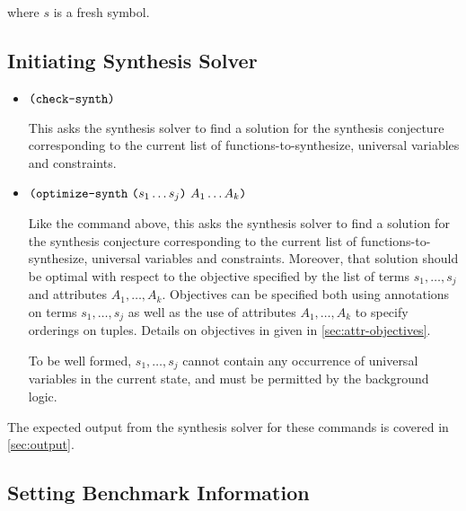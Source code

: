 \documentclass[english,a4paper,10pt]{article}
\begin{document}
\begin{itemize}
where $s$ is a fresh symbol. 





\end{itemize}	


\subsection{Initiating Synthesis Solver}

\begin{itemize}
\item $\texttt{(}\texttt{check-synth}\texttt{)}$

This asks the synthesis solver to find a solution for the synthesis conjecture
corresponding to the current list of functions-to-synthesize,
universal variables and constraints.

\item $\texttt{(}\texttt{optimize-synth}\mbox{ }\texttt{(}s_1 \ldots s_j\texttt{)}\mbox{ } A_1 \ldots A_k\texttt{)}$

Like the command above,
this asks the synthesis solver to find a solution for the synthesis conjecture
corresponding to the current list of functions-to-synthesize,
universal variables and constraints.
Moreover, that solution should be optimal with respect to the objective
specified by the list of terms $s_1, \ldots, s_j$ and attributes $A_1, \ldots, A_k$.
Objectives can be specified both using annotations on terms $s_1, \ldots, s_j$
as well as the use of attributes $A_1, \ldots, A_k$ to specify orderings on tuples.
Details on objectives in given in \cref{sec:attr-objectives}.

To be well formed, $s_1, \ldots, s_j$ cannot contain any occurrence
of universal variables in the current state,
and must be permitted by the background logic.
\end{itemize}

The expected output
from the synthesis solver for these commands is covered in \cref{sec:output}.

\subsection{Setting Benchmark Information}
\end{document}
